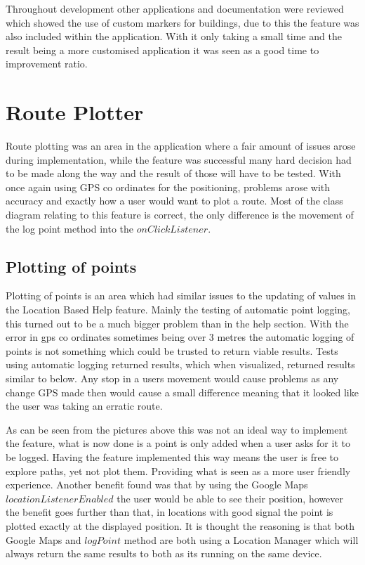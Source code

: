Throughout development other applications and documentation were reviewed which showed the use of custom markers for buildings, due to this the feature was also included within the application. With it only taking a small time and the result being a more customised application it was seen as a good time to improvement ratio. 

\section{Route Plotter}
Route plotting was an area in the application where a fair amount of issues arose during implementation, while the feature was successful many hard decision had to be made along the way and the result of those will have to be tested. With once again using GPS co ordinates for the positioning, problems arose with accuracy and exactly how a user would want to plot a route. Most of the class diagram relating to this feature is correct, the only difference is the movement of the log point method into the $onClickListener$.
\subsection{Plotting of points}
Plotting of points is an area which had similar issues to the updating of values in the Location Based Help feature. Mainly the testing of automatic point logging, this turned out to be a much bigger problem than in the help section. With the error in gps co ordinates sometimes being over 3 metres the automatic logging of points is not something which could be trusted to return viable results. Tests using automatic logging returned results, which when visualized, returned results similar to below. Any stop in a users movement would cause problems as any change GPS made then would cause a small difference meaning that it looked like the user was taking an erratic route.

As can be seen from the pictures above this was not an ideal way to implement the feature, what is now done is a point is only added when a user asks for it to be logged. Having the feature implemented this way means the user is free to explore paths, yet not plot them. Providing what is seen as a more user friendly experience. Another benefit found was that by using the Google Maps $locationListenerEnabled$ the user would be able to see their position, however the benefit goes further than that, in locations with good signal the point is plotted exactly at the displayed position. It is thought the reasoning is that both Google Maps and $logPoint$ method are both using a Location Manager which will always return the same results to both as its running on the same device.
